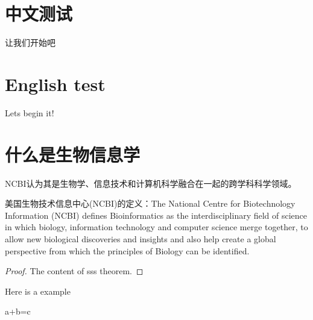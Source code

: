 \documentclass[]{subook}
\begin{document}
\section{中文测试}
让我们开始吧~ 
\zhlipsum[1-3]

\section{English test}

Lets begin it!
\lipsum[1-2]


\section{什么是生物信息学
}

NCBI认为其是生物学、信息技术和计算机科学融合在一起的跨学科科学领域。

美国生物技术信息中心(NCBI)的定义：The National Centre for Biotechnology Information (NCBI) defines Bioinformatics as the interdisciplinary field of science in which biology, information technology and computer science merge together, to allow new biological discoveries and insights and also help create a global perspective from which the principles of Biology can be identified. 
\begin{proof}
    The content of sss theorem.
\end{proof}



Here is a example
\begin{example}
    a+b=c
\end{example}
\end{document}
